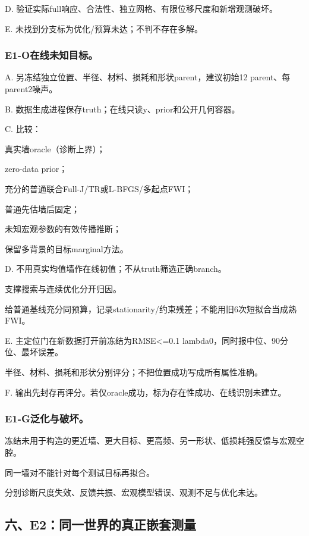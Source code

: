 \documentclass[
  10pt,
  a4paper,
]{article}
\begin{document}
D. 验证实际full响应、合法性、独立网格、有限位移尺度和新增观测破坏。

E. 未找到分支标为优化/预算未达；不判不存在多解。

\hypertarget{e1-oux5728ux7ebfux672aux77e5ux76eeux6807-1}{%
\subsubsection{E1-O在线未知目标。}\label{e1-oux5728ux7ebfux672aux77e5ux76eeux6807-1}}

A. 另冻结独立位置、半径、材料、损耗和形状parent，建议初始12
parent、每parent2噪声。

B. 数据生成进程保存truth；在线只读y、prior和公开几何容器。

C. 比较：

真实墙oracle（诊断上界）；

zero-data prior；

充分的普通联合Full-J/TR或L-BFGS/多起点FWI；

普通先估墙后固定；

未知宏观参数的有效传播推断；

保留多背景的目标marginal方法。

D. 不用真实均值墙作在线初值；不从truth筛选正确branch。

支撑搜索与连续优化分开归因。

给普通基线充分同预算，记录stationarity/约束残差；不能用旧6次短拟合当成熟FWI。

E. 主定位门在新数据打开前冻结为RMSE\textless=0.1
lambda0，同时报中位、90分位、最坏误差。

半径、材料、损耗和形状分别评分；不把位置成功写成所有属性准确。

F. 输出先封存再评分。若仅oracle成功，标为存在性成功、在线识别未建立。

\hypertarget{e1-gux6cdbux5316ux4e0eux7834ux574f}{%
\subsubsection{E1-G泛化与破坏。}\label{e1-gux6cdbux5316ux4e0eux7834ux574f}}

冻结未用于构造的更近墙、更大目标、更高频、另一形状、低损耗强反馈与宏观空腔。

同一墙对不能针对每个测试目标再拟合。

分别诊断尺度失效、反馈共振、宏观模型错误、观测不足与优化未达。

\hypertarget{ux516de2ux540cux4e00ux4e16ux754cux7684ux771fux6b63ux5d4cux5957ux6d4bux91cf}{%
\subsection{六、E2：同一世界的真正嵌套测量}\label{ux516de2ux540cux4e00ux4e16ux754cux7684ux771fux6b63ux5d4cux5957ux6d4bux91cf}}
\end{document}
